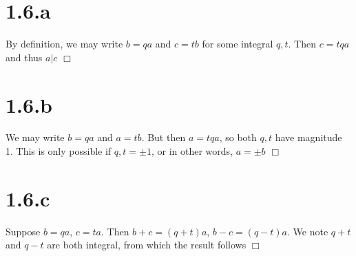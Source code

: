 \documentclass{article}
\begin{document}
\section*{1.6.a}
By definition, we may write $b = qa$ and $c = tb$ for some integral $q,t$. Then $c = tqa$ and thus $a|c$ $\Box$
\section*{1.6.b}
We may write $b = qa$ and $a = tb$. But then $a = tqa$, so both $q,t$ have magnitude 1. This is only possible if $q,t = \pm 1$, or in other words, $a = \pm b$ $\Box$
\section*{1.6.c}
Suppose $b = qa$, $c = ta$. Then $b+c = (q+t)a$, $b-c = (q-t)a$. We note $q+t$ and $q-t$ are both integral, from which the result follows $\Box$
\end{document}
